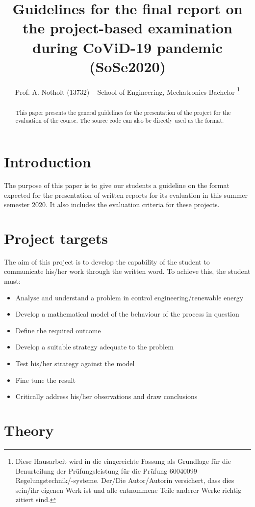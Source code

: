 \documentclass[a4paper, 10pt]{IEEEtran}
\title{Guidelines for the final report on the project-based examination during CoViD-19 pandemic (SoSe2020)}%
\author{Prof. A. Notholt (13732)%
			-- School of Engineering, Mechatronics Bachelor %
			\thanks{Diese Hausarbeit wird in die eingereichte Fassung als Grundlage für die Benurteilung 
		            der Prüfungsleistung für die Prüfung
	            	60040099 %
	            	Regelungstechnik/-systeme. %
            	 	Der/Die Autor/Autorin versichert, dass dies sein/ihr eigenen Werk ist und alle entnommene Teile anderer Werke richtig zitiert sind.
             		}}
\begin{document}
	
	
	\maketitle
	
	\begin{abstract} %
		This paper presents the general guidelines for the presentation of the project for the evaluation of the course. The source code can also be directly used as the format.
	\end{abstract}
	
	\section{Introduction}
	
	The purpose of this paper is to give our students a guideline on the format expected for the presentation of written reports for its evaluation in this summer semester 2020. It also includes the evaluation criteria for these projects.
	
	\section{Project targets}
	
	The aim of this project is to develop the capability of the student to communicate his/her work through the written word. To achieve this, the student must:
	
	\begin{itemize}
		\item Analyse and understand a problem in control engineering/renewable energy
		\item Develop a mathematical model of the behaviour of the process in question
		\item Define the required outcome
		\item Develop a suitable strategy adequate to the problem
		\item Test his/her strategy against the model
		\item Fine tune the result
		\item Critically address his/her observations and draw conclusions
	\end{itemize}
	
	\section{Theory}
	
\end{document}
